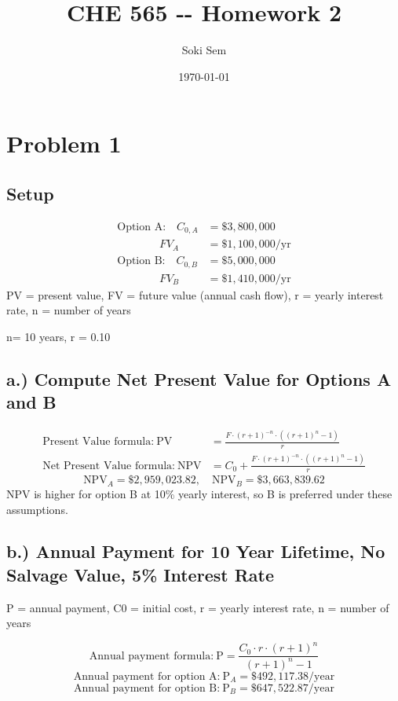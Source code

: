 \documentclass{article}%
\title{CHE 565 {-}{-} Homework 2}%
\author{Soki Sem}%
\date{\today}%
\begin{document}
%
\normalsize%
\setlength{\parindent}{0pt}%
\setlength{\parskip}{0.6em}%
\maketitle%
\section*{Problem 1}%
\label{sec:Problem1}%
\subsection*{Setup}%
\label{subsec:Setup}%
\begin{align*}%
\text{Option A:}\quad C_{0,A} &= \$3{,}800{,}000 \\%
\quad\quad\quad\;\;\; FV_A &= \$1{,}100{,}000/\text{yr} \\%
\text{Option B:}\quad C_{0,B} &= \$5{,}000{,}000 \\%
\quad\quad\quad\;\;\; FV_B &= \$1{,}410{,}000/\text{yr}%
\end{align*}%
PV = present value, FV = future value (annual cash flow), r = yearly interest rate, n = number of years%
\par%
n= 10 years, r = 0.10%
\par

%
\subsection*{a.) Compute Net Present Value for Options A and B}%
\label{subsec:a.)ComputeNetPresentValueforOptionsAandB}%
\begin{align*}%
\text{Present Value formula:}\ \text{PV} &= \frac{F \cdot \left(r + 1\right)^{- n} \cdot \left(\left(r + 1\right)^{n} - 1\right)}{r} \\%
\text{Net Present Value formula:}\ \text{NPV} &= C_{0} + \frac{F \cdot \left(r + 1\right)^{- n} \cdot \left(\left(r + 1\right)^{n} - 1\right)}{r}%
\end{align*}%
\[%
\text{NPV}_A = \$2,959,023.82,\quad \text{NPV}_B = \$3,663,839.62%
\]%
NPV is higher for option B at 10\% yearly interest, so B is preferred under these assumptions.%
\par

%
\subsection*{b.) Annual Payment for 10 Year Lifetime, No Salvage Value, 5\% Interest Rate}%
\label{subsec:b.)AnnualPaymentfor10YearLifetime,NoSalvageValue,5InterestRate}%
P = annual payment, C0 = initial cost, r = yearly interest rate, n = number of years%
\par%
\[%
\text{Annual payment formula:}\ \text{P} = \frac{C_{0} \cdot r \cdot \left(r + 1\right)^{n}}{\left(r + 1\right)^{n} - 1}%
\]%
\[%
\text{Annual payment for option A:}\ \text{P}_A = \$492,117.38/\text{year}%
\]%
\[%
\text{Annual payment for option B:}\ \text{P}_B = \$647,522.87/\text{year}%
\]
\end{document}
